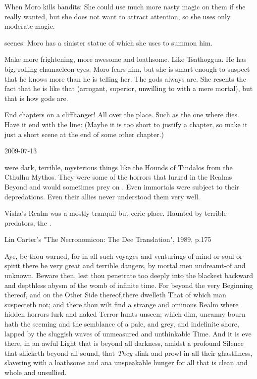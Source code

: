 When Moro kills bandits:
  She could use much more nasty magic on them if she really wanted, but she does not want to attract attention, so she uses only moderate magic. 

\Nasshikerr scenes:
  Moro has a sinister statue of \Nasshikerr which she uses to summon him.

  Make \Nasshikerr more frightening, more awesome and loathsome.
  Like Tsathoggua.
  He has big, rolling chamaeleon eyes. 
  Moro fears him, but she is smart enough to suspect that he knows more than he is telling her. 
  The gods always are. 
  She resents the fact that he is like that (arrogant, superior, unwilling to \cooperate with a mere mortal), but that is how gods are.



End chapters on a cliffhanger! 
All over the place.
Such as the one where \Urizeth dies. 
Have it end with the line: 
(Maybe it is too short to justify a chapter, so make it just a short \Teshrial scene at the end of some other chapter.)



2009-07-13



\Vorcanths were dark, terrible, mysterious things like the Hounds of Tindalos from the Cthulhu Mythos. 
They were some of the horrors that lurked in the Realms Beyond and would sometimes prey on \Miithians. 
Even immortals were subject to their depredations. 
Even their \resphan allies never understood them very well. 


Visha's Realm was a mostly tranquil but eerie place. 
Haunted by terrible predators, the \vorcanths. 

Lin Carter's "The Necronomicon: The Dee Translation", 1989, p.175

  Aye, be thou warned, for in all such voyages and venturings of mind or soul or spirit there be very great and terrible dangers, by mortal men undreamt-of and unknown. 
  Beware then, lest thou penetrate too deeply into the blackest backward and depthless abysm of the womb of infinite time. 
  For beyond the very Beginning thereof, and on the Other Side thereof,there dwelleth That of which man suspecteth not; and there thou wilt find a strange and ominous Realm where hidden horrors lurk and naked Terror hunts unseen; which dim, uncanny bourn hath the seeming and the semblance of a pale, and grey, and indefinite shore, lapped by the sluggish waves of unmeasured and unthinkable Time.
  And it is eve there, in an awful Light that is beyond all darkness, amidst a profound Silence that shieketh beyond all sound, that \emph{They} slink and prowl in all their ghastliness, slavering with a loathsome and ana unspeakable hunger for all that is clean and whole and unsullied.




